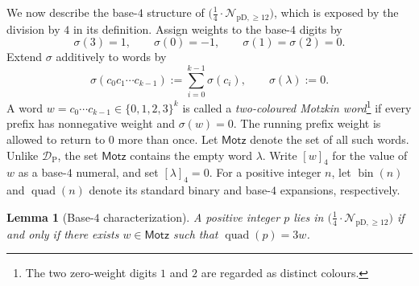 \documentclass[12pt]{article}
\theoremstyle{plain}
\newtheorem{lemma}[theorem]{Lemma}
\theoremstyle{definition}
\theoremstyle{plain}
\newcommand{\DP}{\mathcal{D}_{\mathrm{P}}}
\newcommand{\Pset}{%
  \bigl(\tfrac{1}{4}\cdot\mathcal{N}_{\mathrm{pD},\geq 12}\bigr)%
}
\begin{document}
We now describe the base-$4$ structure of $\Pset$, which is exposed by
the division by $4$ in its definition.  Assign weights to the base-$4$ digits by
\[
  \sigma(3)=1,\qquad \sigma(0)=-1,\qquad
  \sigma(1)=\sigma(2)=0.
\]
Extend $\sigma$ additively to words by
\[
 \sigma(c_0c_1\cdots c_{k-1})
 :=\sum_{i=0}^{k-1}\sigma(c_i),
 \qquad
 \sigma(\lambda):=0.
\]
A word $w=c_0\cdots c_{k-1}\in\{0,1,2,3\}^{k}$ is called a
\emph{two-coloured Motzkin word}\footnote{The two zero-weight digits $1$
and $2$ are regarded as distinct colours.} if every prefix has nonnegative
weight and $\sigma(w)=0$.  The running prefix weight is allowed to return to
$0$ more than once.  Let $\mathsf{Motz}$ denote the set of all such words.
Unlike $\DP$, the set $\mathsf{Motz}$ contains the empty word $\lambda$.
Write $[w]_4$ for the value of $w$ as a base-$4$ numeral, and set
$[\lambda]_4=0$.  For a positive integer $n$, let
$\operatorname{bin}(n)$ and $\operatorname{quad}(n)$ denote its standard
binary and base-$4$ expansions, respectively.

\begin{lemma}[Base-$4$ characterization]\label{lem:base4}
A positive integer $p$ lies in $\Pset$ if and only if there exists
$w\in\mathsf{Motz}$ such that $\operatorname{quad}(p)=3w$.
\end{lemma}
\end{document}
